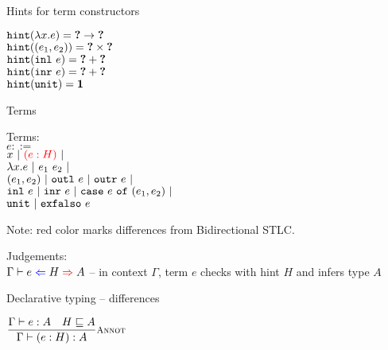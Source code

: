 \documentclass{beamer}
\begin{document}
\begin{frame}{Hints for term constructors}

\begin{center}
  $\hintfor{\fun{x}{e}} = \Fun{\Hole}{\Hole}$ \\
  $\hintfor{\pair{e_1}{e_2}} = \Prod{\Hole}{\Hole}$ \\
  $\hintfor{\inl{e}} = \Sum{\Hole}{\Hole}$ \\
  $\hintfor{\inr{e}} = \Sum{\Hole}{\Hole}$ \\
  $\hintfor{\unit} = \Unit$
\end{center}

\end{frame}

\begin{frame}{Terms}

Terms: \\
$e ::=$ \\
\qquad $x \pipe \termdiff{\annot{e}{H}} \pipe $ \\
\qquad $\fun{x}{e} \pipe \app{e_1}{e_2} \pipe$ \\
\qquad $\pair{e_1}{e_2} \pipe \outl{e} \pipe \outr{e} \pipe$ \\
\qquad $\inl{e} \pipe \inr{e} \pipe \case{e}{e_1}{e_2} \pipe$ \\
\qquad $\unit \pipe \exfalso{e}$

\vspace{2em}

Note: red color marks differences from Bidirectional STLC.

\vspace{2em}

Judgements: \\
$\fullhinting{\Gamma}{e}{H}{A}$ -- in context $\Gamma$, term $e$ checks with hint $H$ and infers type $A$

\end{frame}

\begin{frame}{Declarative typing -- differences}

\begin{center}
  $\infrule[Annot]{\typing{e}{A} \quad \sidecond{\hintorder{H}{A}}}{\typing{\annot{e}{H}}{A}}$
\end{center}

\end{frame}
\end{document}
